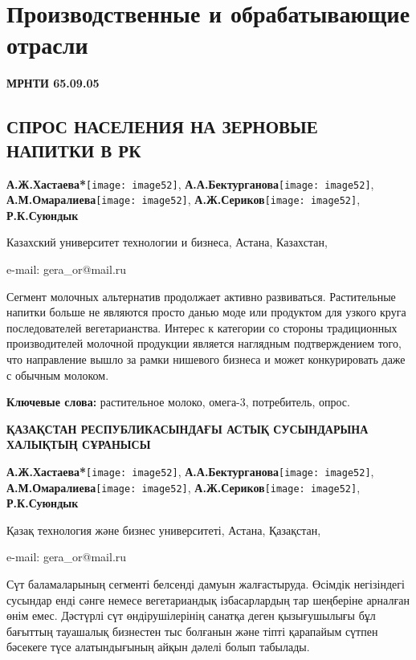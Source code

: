 \let\cleardoublepage\clearpage
\chapter{Производственные и обрабатывающие отрасли}

{\bfseries МРНТИ 65.09.05}

\section{СПРОС НАСЕЛЕНИЯ НА ЗЕРНОВЫЕ НАПИТКИ В РК}

\begin{center}
{\bfseries А.Ж.Хастаева*}\texttt{[image: image52]},
{\bfseries А.А.Бектурганова}\texttt{[image: image52]},
{\bfseries А.М.Омаралиева}\texttt{[image: image52]},
{\bfseries А.Ж.Сериков}\texttt{[image: image52]},
{\bfseries Р.К.Суюндык}

Казахский университет технологии и бизнеса, Астана, Казахстан,

e-mail: gera\_or@mail.ru
\end{center}

Сегмент молочных альтернатив продолжает активно развиваться.
Растительные напитки больше не являются просто данью моде или продуктом
для узкого круга последователей вегетарианства. Интерес к категории со
стороны традиционных производителей молочной продукции является
наглядным подтверждением того, что направление вышло за рамки нишевого
бизнеса и может конкурировать даже с обычным молоком.

{\bfseries Ключевые слова:} растительное молоко, омега-3, потребитель,
опрос.

\begin{center}
{\large\bfseries ҚАЗАҚСТАН РЕСПУБЛИКАСЫНДАҒЫ АСТЫҚ СУСЫНДАРЫНА ХАЛЫҚТЫҢ СҰРАНЫСЫ}

\vspace{1em}
{\bfseries А.Ж.Хастаева*}\texttt{[image: image52]},
{\bfseries А.А.Бектурганова}\texttt{[image: image52]},
{\bfseries А.М.Омаралиева}\texttt{[image: image52]},
{\bfseries А.Ж.Сериков}\texttt{[image: image52]},
{\bfseries Р.К.Суюндык}

Қазақ технология және бизнес университеті, Астана, Қазақстан,

e-mail: gera\_or@mail.ru
\end{center}

Сүт баламаларының сегменті белсенді дамуын жалғастыруда. Өсімдік
негізіндегі сусындар енді сәнге немесе вегетариандық ізбасарлардың тар
шеңберіне арналған өнім емес. Дәстүрлі сүт өндірушілерінің санатқа деген
қызығушылығы бұл бағыттың тауашалық бизнестен тыс болғанын және тіпті
қарапайым сүтпен бәсекеге түсе алатындығының айқын дәлелі болып
табылады.

